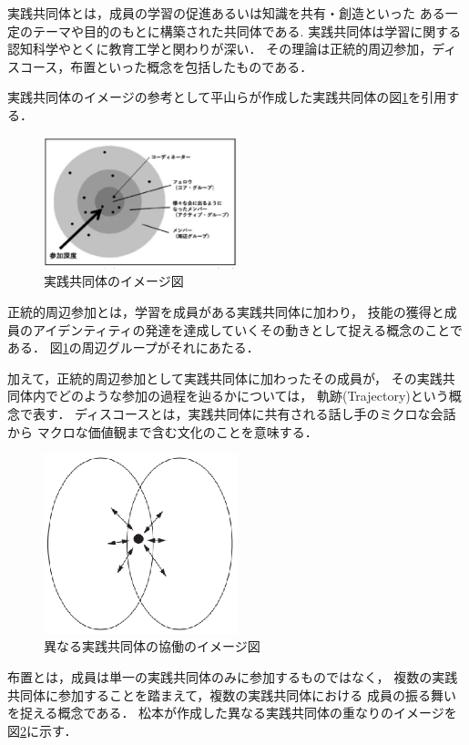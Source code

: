 \documentclass[twoside]{wiss}
\begin{document}
実践共同体とは，成員の学習の促進あるいは知識を共有・創造といった
ある一定のテーマや目的のもとに構築された共同体である.
実践共同体は学習に関する認知科学やとくに教育工学と関わりが深い．
その理論は正統的周辺参加，ディスコース，布置といった概念を包括したものである．

実践共同体のイメージの参考として平山\cite{copImg}らが作成した実践共同体の図\ref{cop}を引用する．

\begin{figure}[h]
  \centering
  \includegraphics[width=0.5\textwidth]{img/cop.eps}
  \caption{実践共同体のイメージ図}
  \label{cop}
\end{figure}

正統的周辺参加とは，学習を成員がある実践共同体に加わり，
技能の獲得と成員のアイデンティティの発達を達成していくその動きとして捉える概念のことである．
図\ref{cop}の周辺グループがそれにあたる．

加えて，正統的周辺参加として実践共同体に加わったその成員が，
その実践共同体内でどのような参加の過程を辿るかについては，
軌跡(Trajectory)という概念で表す．
ディスコースとは，実践共同体に共有される話し手のミクロな会話から
マクロな価値観まで含む文化のことを意味する\cite{discourse}．
\begin{figure}[h]
  \centering
  \includegraphics[width=0.5\textwidth]{img/overlap.eps}
  \caption{異なる実践共同体の協働のイメージ図}
  \label{overlap}
\end{figure}


布置とは，成員は単一の実践共同体のみに参加するものではなく，
複数の実践共同体に参加することを踏まえて，複数の実践共同体における
成員の振る舞いを捉える概念である．
松本\cite{Matsumoto}が作成した異なる実践共同体の重なりのイメージを図\ref{overlap}に示す．
\end{document}
